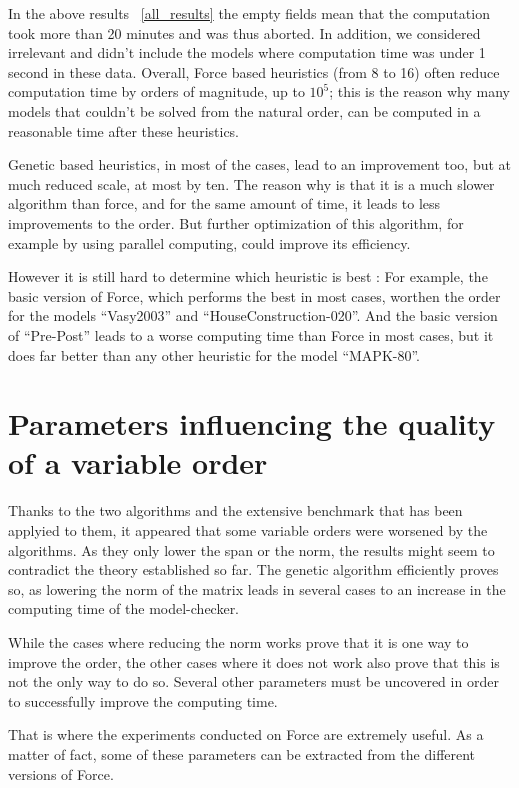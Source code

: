 \documentclass[12pt]{report}
\begin{document}
In the above results ~\ref{all_results} the empty fields mean that the computation took more than 20 minutes and was thus aborted. In addition, we considered irrelevant and didn't include the models where computation time was under 1 second in these data.
Overall, Force based heuristics (from 8 to 16) often reduce computation time by orders of magnitude, up to $10^5$; this is the reason why many models that couldn't be solved from the natural order, can be computed in a reasonable time after these heuristics.

Genetic based heuristics, in most of the cases, lead to an improvement too, but at much reduced scale, at most by ten. The reason why is that it is a much slower algorithm than force, and for the same amount of time, it leads to less improvements to the order. But further optimization of this algorithm, for example by using parallel computing, could improve its efficiency.

However it is still hard to determine which heuristic is best : For example, the basic version of Force, which performs the best in most cases, worthen the order for the models \enquote{Vasy2003} and \enquote{HouseConstruction-020}. And the basic version of \enquote{Pre-Post} leads to a worse computing time than Force in most cases, but it does far better than any other heuristic for the model \enquote{MAPK-80}.

\chapter{Parameters influencing the quality of a variable order}

Thanks to the two algorithms and the extensive benchmark that has been applyied to them, it appeared that some variable orders were worsened by the algorithms. As they only lower the span or the norm, the results might seem to contradict the theory established so far.
The genetic algorithm efficiently proves so, as lowering the norm of the matrix leads in several cases to an increase in the computing time of the model-checker. 

While the cases where reducing the norm works prove that it is one way to improve the order, the other cases where it does not work also prove that this is not the only way to do so. Several other parameters must be uncovered in order to successfully improve the computing time.

That is where the experiments conducted on Force are extremely useful. As a matter of fact, some of these parameters can be extracted from the different versions of Force.
\end{document}
